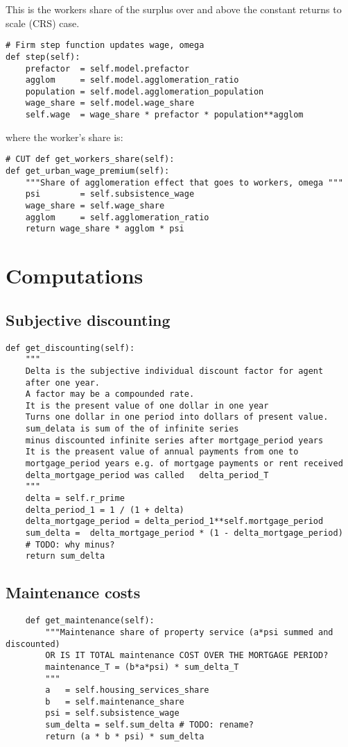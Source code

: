 This is the workers share of the surplus over and above the constant returns to scale (CRS) case.

\begin{lstlisting}
# Firm step function updates wage, omega
def step(self):
    prefactor  = self.model.prefactor
    agglom     = self.model.agglomeration_ratio
    population = self.model.agglomeration_population
    wage_share = self.model.wage_share
    self.wage  = wage_share * prefactor * population**agglom
\end{lstlisting}

where the worker's share is:

\begin{lstlisting}
# CUT def get_workers_share(self):
def get_urban_wage_premium(self):
    """Share of agglomeration effect that goes to workers, omega """
    psi        = self.subsistence_wage
    wage_share = self.wage_share
    agglom     = self.agglomeration_ratio
    return wage_share * agglom * psi
\end{lstlisting}


\section{Computations}

\subsection{Subjective discounting}
\begin{lstlisting}
def get_discounting(self):
    """
    Delta is the subjective individual discount factor for agent
    after one year. 
    A factor may be a compounded rate.
    It is the present value of one dollar in one year 
    Turns one dollar in one period into dollars of present value.
    sum_delata is sum of the of infinite series 
    minus discounted infinite series after mortgage_period years
    It is the preasent value of annual payments from one to 
    mortgage_period years e.g. of mortgage payments or rent received
    delta_mortgage_period was called   delta_period_T
    """
    delta = self.r_prime
    delta_period_1 = 1 / (1 + delta) 
    delta_mortgage_period = delta_period_1**self.mortgage_period
    sum_delta =  delta_mortgage_period * (1 - delta_mortgage_period)
    # TODO: why minus?
    return sum_delta
\end{lstlisting}

\subsection{Maintenance costs}
\begin{lstlisting}
    def get_maintenance(self):
        """Maintenance share of property service (a*psi summed and discounted)
        OR IS IT TOTAL maintenance COST OVER THE MORTGAGE PERIOD?
        maintenance_T = (b*a*psi) * sum_delta_T
        """
        a   = self.housing_services_share
        b   = self.maintenance_share
        psi = self.subsistence_wage
        sum_delta = self.sum_delta # TODO: rename?
        return (a * b * psi) * sum_delta
\end{lstlisting}

